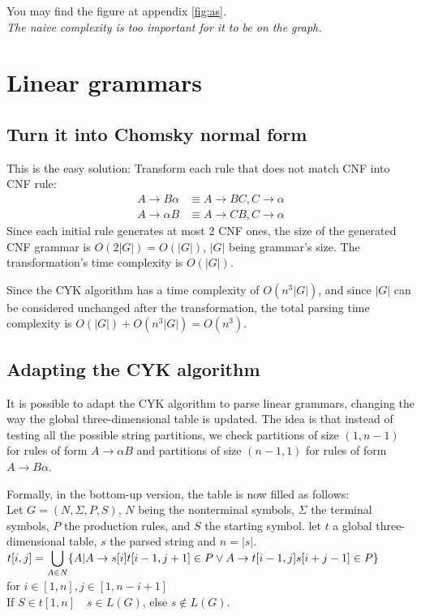 \documentclass[twocolumn]{article}
\begin{document}
You may find the figure at appendix \ref{fig:as}.\\
\textit{The naive complexity is too important for it to be on the graph.}
\\

\section{Linear grammars}
\subsection{Turn it into Chomsky normal form}
This is the easy solution: Transform each rule that does not match CNF into CNF
rule:
\begin{align*}
  A\rightarrow B\alpha&\equiv A\rightarrow BC,C\rightarrow\alpha \\
  A\rightarrow\alpha B&\equiv A\rightarrow CB,C\rightarrow\alpha
\end{align*}
Since each initial rule generates at most 2 CNF ones, the size of the generated
CNF grammar is $O(2|G|)=O(|G|)$, $|G|$ being grammar's size. The transformation's time complexity is $O(|G|)$.

Since the CYK algorithm has a time complexity of $O(n^3|G|)$, and since $|G|$ can be considered unchanged after the transformation, the total parsing time complexity is $O(|G|)+O(n^3|G|)=O(n^3)$.

\subsection{Adapting the CYK algorithm}
It is possible to adapt the CYK algorithm to parse linear grammars, changing the way the global three-dimensional table is updated. The idea is that instead of testing all the possible string partitions, we check partitions of size $(1, n-1)$ for rules of form $A\rightarrow\alpha B$ and partitions of size $(n-1,1)$ for rules of form $A\rightarrow B\alpha$.

Formally, in the bottom-up version, the table is now filled as follows:\\
Let $G=(N,\Sigma,P,S)$, $N$ being the nonterminal symbols, $\Sigma$ the terminal symbols, $P$ the production rules, and $S$ the starting symbol. let $t$ a global three-dimensional table, $s$ the parsed string and $n = |s|$.\\
$t[i,j]=\displaystyle\bigcup_{A\in N}\{A|A\rightarrow s[i]t[i-1,j+1]\in P\newline\lor A \rightarrow t[i-1,j]s[i+j-1] \in P\}$\\for $i\in [1,n],j \in [1, n-i+1]$\\
If $S \in t[1,n]\quad s \in L(G)$, else $s \notin L(G)$.
\end{document}
